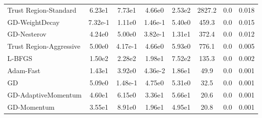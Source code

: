 \documentclass{article}
\begin{document}
\begin{table}[htbp]
{\begin{tabular}{p{2.5cm}*{7}{c}}
Trust Region-Standard & 6.23e1 & 7.73e1 & 4.66e0 & 2.53e2 & 2827.2 & 0.0 & 0.018 \\
GD-WeightDecay & 7.32e-1 & 1.11e0 & 1.46e-1 & 5.40e0 & 459.3 & 0.0 & 0.015 \\
GD-Nesterov & 4.24e0 & 5.00e0 & 3.82e-1 & 1.31e1 & 372.4 & 0.0 & 0.012 \\
Trust Region-Aggressive & 5.00e0 & 4.17e-1 & 4.66e0 & 5.93e0 & 776.1 & 0.0 & 0.005 \\
L-BFGS & 1.50e2 & 2.28e2 & 1.98e1 & 7.52e2 & 135.3 & 0.0 & 0.002 \\
Adam-Fast & 1.43e1 & 3.92e0 & 4.36e-2 & 1.86e1 & 49.9 & 0.0 & 0.001 \\
GD & 5.09e0 & 1.48e-1 & 4.75e0 & 5.31e0 & 32.5 & 0.0 & 0.001 \\
GD-AdaptiveMomentum & 4.60e1 & 6.15e0 & 3.36e1 & 5.66e1 & 20.6 & 0.0 & 0.001 \\
GD-Momentum & 3.55e1 & 8.91e0 & 1.96e1 & 4.95e1 & 20.8 & 0.0 & 0.001 \\
\bottomrule
\end{tabular}
}
\end{table}
\end{document}

